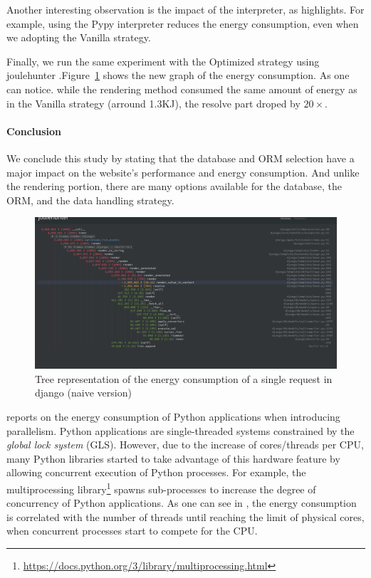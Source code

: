 Another interesting observation is the impact of the interpreter, as  highlights.
For example, using the \textsf{Pypy} interpreter reduces the energy consumption, even when we adopting the \textsf{Vanilla} strategy.

Finally, we run the same experiment with the \textsf{Optimized} strategy 
using joulehunter
.Figure~\ref{fig:django_profiled_optimized} shows the new graph of the energy consumption. As one can notice. while the rendering method consumed the same amount of energy as in  the \textsf{Vanilla} strategy (arround 1.3KJ), the resolve part droped by $20\times$. 

\paragraph{Conclusion}
We conclude this study by stating that the database and ORM selection have a major impact on the website's performance and energy consumption.
And unlike the rendering portion, there are many options available for the database, the ORM, and the data handling strategy.
\begin{figure}[hbt]
    \centering
    \includegraphics[width=\linewidth]{imgs/django_profiled_optimized}
    \caption{Tree representation of the energy consumption of a single request in django (naive version)}
    \label{fig:django_profiled_optimized}
\end{figure}



 reports on the energy consumption of Python applications when introducing parallelism.
Python applications are single-threaded systems constrained by the \emph{global lock system} (GLS).
However, due to the increase of cores/threads per CPU, many Python libraries started to take advantage of this hardware feature by allowing concurrent execution of Python processes.
For example, the multiprocessing library\footnote{\url{https://docs.python.org/3/library/multiprocessing.html}} spawns sub-processes to increase the degree of concurrency of Python applications.
As one can see in , the energy consumption is correlated with the number of threads until reaching the limit of physical cores, when concurrent processes start to compete for the CPU.


